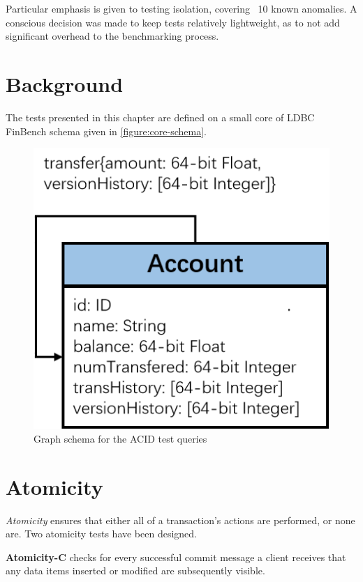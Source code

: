 Particular emphasis is given to testing isolation, covering ~10 known anomalies.
A conscious decision was made to keep tests relatively lightweight, as to not 
add significant overhead to the benchmarking process.

\section{Background}

The tests presented in this chapter are defined on a small core of LDBC FinBench
schema given in \autoref{figure:core-schema}.

\begin{figure}[htbp]
    \centering
    \includegraphics[scale=0.5]{figures/acid/acid-schema}
    \caption{Graph schema for the ACID test queries}
    \label{figure:core-schema}
\end{figure}

\begin{figure}[h]
  \centering
  
\end{figure}

\section{Atomicity}

\emph{Atomicity} ensures that either all of a transaction's actions are 
performed, or none are. Two atomicity tests have been designed.

{\flushleft \textbf{Atomicity-C}} checks for every successful commit message a
client receives that any data items inserted or modified are subsequently visible.


